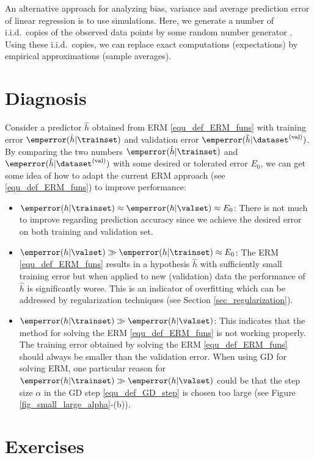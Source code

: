 \documentclass[12pt]{report}
\begin{document}
An alternative approach for analyzing bias, variance and average 
prediction error of linear regression is to use simulations. Here, we 
generate a number of i.i.d.\ copies of the observed data points by 
some random number generator \cite{Andrieu2001}. Using these 
i.i.d.\ copies, we can replace exact computations (expectations) 
by empirical approximations (sample averages).  


\section{Diagnosis} 
Consider a predictor $\hat{h}$ obtained from ERM \eqref{equ_def_ERM_funs} 
with training error $\emperror(\hat{h}| \trainset)$ and validation 
error $\emperror(\hat{h}| \dataset^{(\rm val)})$. By comparing 
the two numbers $\emperror(\hat{h}| \trainset)$ and $\emperror(\hat{h}| \dataset^{(\rm val)})$ 
with some desired or tolerated error $E_{0}$, we can get 
some idea of how to adapt the current ERM approach 
(see \eqref{equ_def_ERM_funs}) to improve performance: 
\begin{itemize} 
\item $\emperror(h| \trainset) \approx \emperror(h| \valset) \approx E_{0}$: 
There is not much to improve regarding prediction accuracy since we 
achieve the desired error on both training and validation set.
\item $\emperror(h| \valset) \gg \emperror(h| \trainset) \approx E_{0}$: 
The ERM \eqref{equ_def_ERM_funs} results in a hypothesis $\hat{h}$ 
with sufficiently small training error but when applied to new (validation) 
data the performance of $\hat{h}$ is significantly worse. This is an 
indicator of overfitting which can be addressed by regularization 
techniques (see Section \ref{sec_regularization}). 
\item $\emperror(h| \trainset) \gg \emperror(h| \valset)$: 
This indicates that the method for solving the ERM \eqref{equ_def_ERM_funs} 
is not working properly. The training error obtained by solving the 
ERM \eqref{equ_def_ERM_funs} should always be smaller than the 
validation error. When using GD for solving ERM, one particular 
reason for $\emperror(h| \trainset) \gg \emperror(h| \valset)$ 
could be that the step size $\alpha$ in the GD step \eqref{equ_def_GD_step} 
is chosen too large (see Figure \ref{fig_small_large_alpha}-(b)). 
\end{itemize}

\section{Exercises} 
\end{document}
